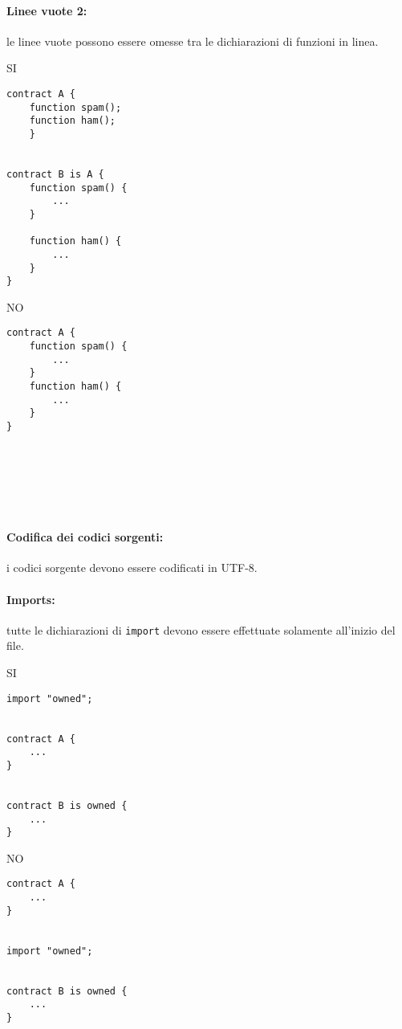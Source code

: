 \documentclass[../ProcessiPrimari.tex]{subfiles}
\begin{document}
\paragraph{Linee vuote 2: }
le linee vuote possono essere omesse tra le dichiarazioni di funzioni in linea.
\begin{center}{
\begin{minipage}{6cm}
{\begin{center}SI\end{center}}
\begin{Verbatim}[frame=single]
contract A {
    function spam();
    function ham();
    }


contract B is A {
    function spam() {
        ...
    }

    function ham() {
        ...
    }
}
\end{Verbatim}
\end{minipage}
\hfil
\begin{minipage}{6cm}
{\begin{center}NO\end{center}}
\begin{Verbatim}[frame=single]
contract A {
    function spam() {
        ...
    }
    function ham() {
        ...
    }
}







\end{Verbatim}
\end{minipage}
}
\end{center}

\paragraph*{Codifica dei codici sorgenti: }
i codici sorgente devono essere codificati in UTF-8.

\paragraph*{Imports: }
tutte le dichiarazioni di \texttt{import} devono essere effettuate solamente all'inizio del file.

\begin{center}{
\begin{minipage}{6cm}
{\begin{center}SI\end{center}}
\begin{Verbatim}[frame=single]
import "owned";


contract A {
    ...
}


contract B is owned {
    ...
}
\end{Verbatim}
\end{minipage}
\hfil
\begin{minipage}{6cm}
{\begin{center}NO\end{center}}
\begin{Verbatim}[frame=single]
contract A {
    ...
}


import "owned";


contract B is owned {
    ...
}
\end{Verbatim}
\end{minipage}
}
\end{center}
\end{document}
